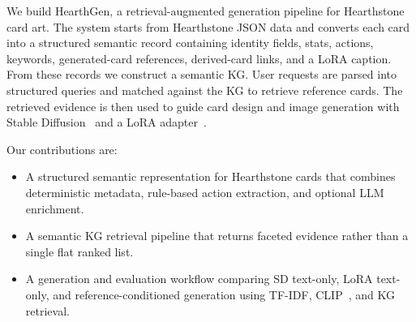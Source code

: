 \documentclass[10pt,twocolumn,letterpaper]{article}
\begin{document}
We build HearthGen, a retrieval-augmented generation pipeline for Hearthstone card art. The system starts from Hearthstone JSON data and converts each card into a structured semantic record containing identity fields, stats, actions, keywords, generated-card references, derived-card links, and a LoRA caption. From these records we construct a semantic KG. User requests are parsed into structured queries and matched against the KG to retrieve reference cards. The retrieved evidence is then used to guide card design and image generation with Stable Diffusion~\cite{rombach2022ldm} and a LoRA adapter~\cite{hu2021lora}.

Our contributions are:
\begin{itemize}
\item A structured semantic representation for Hearthstone cards that combines deterministic metadata, rule-based action extraction, and optional LLM enrichment.
\item A semantic KG retrieval pipeline that returns faceted evidence rather than a single flat ranked list.
\item A generation and evaluation workflow comparing SD text-only, LoRA text-only, and reference-conditioned generation using TF-IDF, CLIP~\cite{radford2021clip}, and KG retrieval.
\end{itemize}
\end{document}
